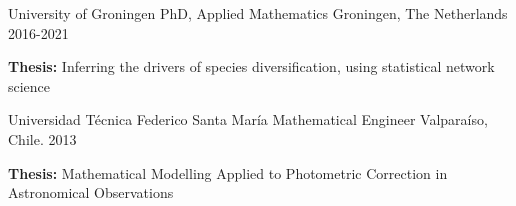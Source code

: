 

\begin{cventries}

  \cventry
    {University of Groningen} %
    {PhD, Applied Mathematics} %
    {Groningen, The Netherlands} %
    {2016-2021} %
    {
      \begin{cvitems} %
        \item {\textbf{Thesis:}  Inferring the drivers of species diversification, using statistical network science}
      \end{cvitems}
    }
    
  \cventry
    {Universidad T\'ecnica Federico Santa Mar\'ia} %
    {Mathematical Engineer} %
    {Valpara\'iso, Chile. } %
    {2013} %
    {
      \begin{cvitems} %
        \item {\textbf{Thesis:} Mathematical Modelling Applied to Photometric Correction in Astronomical Observations} 
      \end{cvitems}
    }
    
\end{cventries}

